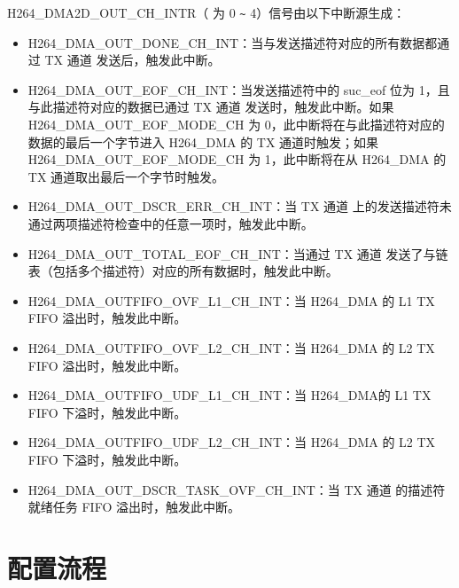 \documentclass[main\_\_CN.tex]{subfiles}
\begin{document}
\label{int:H264DMAOUTCHNINT}H264\_DMA2D\_OUT\_CH{}\_INTR（ 为 0 \verb+~+ 4）信号由以下中断源生成：

\begin{itemize}
\item \label{int:H264DMAOUTDONECHNINT}H264\_DMA\_OUT\_DONE\_CH{}\_INT：当与发送描述符对应的所有数据都通过 TX 通道  发送后，触发此中断。
\item \label{int:H264DMAOUTEOFCHNINT}H264\_DMA\_OUT\_EOF\_CH{}\_INT：当发送描述符中的 suc\_eof 位为 1，且与此描述符对应的数据已通过 TX 通道  发送时，触发此中断。如果 H264\_DMA\_OUT\_EOF\_MODE\_CH{} 为 0，此中断将在与此描述符对应的数据的最后一个字节进入 H264\_DMA 的 TX 通道时触发；如果 H264\_DMA\_OUT\_EOF\_MODE\_CH{} 为 1，此中断将在从 H264\_DMA 的 TX 通道取出最后一个字节时触发。
\item \label{int:H264DMAOUTDSCRERRCHNINT}H264\_DMA\_OUT\_DSCR\_ERR\_CH{}\_INT：当 TX 通道  上的发送描述符未通过两项描述符检查中的任意一项时，触发此中断。
\item \label{int:H264DMAOUTTOTALEOFCHNINT}H264\_DMA\_OUT\_TOTAL\_EOF\_CH{}\_INT：当通过 TX 通道  发送了与链表（包括多个描述符）对应的所有数据时，触发此中断。
\item \label{int:H264DMAOUTFIFOOVFL1CHNINT}H264\_DMA\_OUTFIFO\_OVF\_L1\_CH{}\_INT：当 H264\_DMA 的 L1 TX FIFO 溢出时，触发此中断。
\item \label{int:H264DMAOUTFIFOOVFL2CHNINT}H264\_DMA\_OUTFIFO\_OVF\_L2\_CH{}\_INT：当 H264\_DMA 的 L2 TX FIFO 溢出时，触发此中断。
\item \label{int:H264DMAOUTFIFOUDFL1CHNINT}H264\_DMA\_OUTFIFO\_UDF\_L1\_CH{}\_INT：当 H264\_DMA的 L1 TX FIFO 下溢时，触发此中断。
\item \label{int:H264DMAOUTFIFOUDFL2CHNINT}H264\_DMA\_OUTFIFO\_UDF\_L2\_CH{}\_INT：当 H264\_DMA 的 L2 TX FIFO 下溢时，触发此中断。
\item \label{int:H264DMAOUTDSCRTASKOVFCHNINT}H264\_DMA\_OUT\_DSCR\_TASK\_OVF\_CH{}\_INT：当 TX 通道  的描述符就绪任务 FIFO 溢出时，触发此中断。
\end{itemize}


\section{配置流程}
\label{sec:h264enc-prog-procedures}
\end{document}
